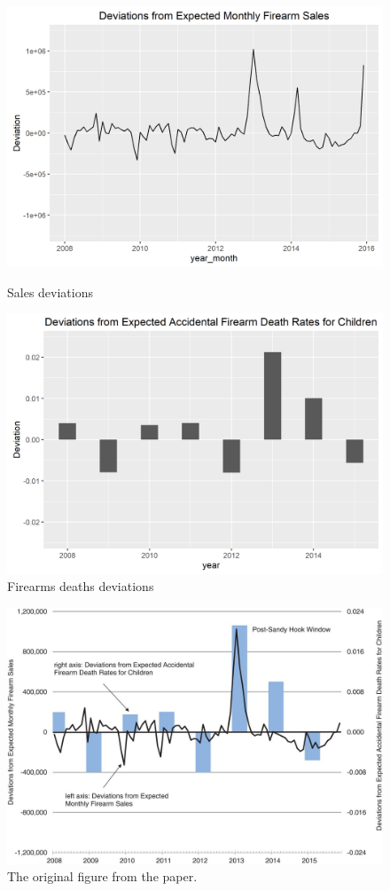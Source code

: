 \documentclass[12pt]{article}%
\begin{document}
\begin{figure}[htbb]
	\begin{minipage}[b]{0.5\linewidth}
		\centering
		\includegraphics[width=\linewidth]{figures/fig2_sales.png}
		\caption{Sales deviations}
		\label{fig:fig2_sales}
	\end{minipage}
	\hspace{0.5cm}
	\begin{minipage}[b]{0.5\linewidth}
		\centering
		\includegraphics[width=\linewidth]{figures/fig2_deaths.png}
		\caption{Firearms deaths deviations}
		\label{fig:fig2_deaths}
	\end{minipage}
\end{figure}
\begin{figure}[hbt]
	\centering
	\includegraphics[width=0.75\linewidth]{figures/fig2_original.jpg}
	\caption{The original figure from the paper.}
	\label{fig:fig2_original}
\end{figure}
\end{document}
